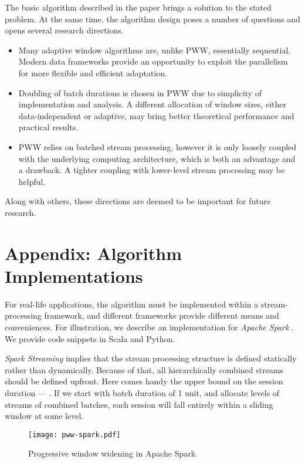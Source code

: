 \documentclass[runningheads,a4paper]{llncs}
\begin{document}
The basic algorithm described in the paper brings a solution to
the stated problem. At the same time, the algorithm design poses
a number of questions and opens several research directions. 
\begin{itemize}
    \item Many adaptive window algorithms are, unlike PWW, essentially
        sequential. Modern data frameworks provide an opportunity to
        exploit the parallelism for more flexible and efficient
        adaptation.
    \item Doubling of batch durations is chosen in PWW due to
        simplicity of implementation and analysis. A different
        allocation of window sizes, either data-independent or
        adaptive, may bring better theoretical performance and
        practical results.
    \item PWW relies on batched stream processing,
        however it is only loosely coupled with the underlying 
        computing architecture, which is both an advantage and a
        drawback. A tighter coupling with lower-level
        stream processing may be helpful.
\end{itemize}
Along with others, these directions are deemed to be important
for future research.




\clearpage
\section*{Appendix: Algorithm Implementations}

For real-life applications, the algorithm must be implemented
within a stream-processing framework, and different frameworks
provide different means and conveniences. For illustration, we
describe an implementation for {\it Apache Spark} \cite{ZCF+10}. We
provide code snippets in Scala and Python.

{\it Spark Streaming} implies that the stream processing
structure is defined statically rather than dynamically. Because
of that, all hierarchically combined streams should be defined
upfront.  Here comes handy the upper bound on the session
duration --- . If we start with batch duration of 1
unit, and allocate  levels of
streams of combined batches, each session will fall entirely
within a sliding window at some level.

\begin{figure}
    \centering
	\texttt{[image: pww-spark.pdf]}
	\caption{Progressive window widening in Apache Spark.}
    \label{fig:pww-spark}
\end{figure}
\end{document}
